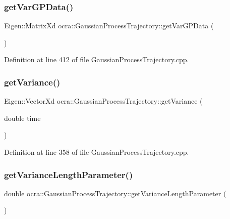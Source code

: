 \subsubsection{\texorpdfstring{get\+Var\+G\+P\+Data()}{getVarGPData()}}
{\footnotesize\ttfamily Eigen\+::\+Matrix\+Xd ocra\+::\+Gaussian\+Process\+Trajectory\+::get\+Var\+G\+P\+Data (\begin{DoxyParamCaption}{ }\end{DoxyParamCaption})}



Definition at line 412 of file Gaussian\+Process\+Trajectory.\+cpp.

\hypertarget{classocra_1_1GaussianProcessTrajectory_ac90c0664984dabfb530aa0437ec0a740}{}\label{classocra_1_1GaussianProcessTrajectory_ac90c0664984dabfb530aa0437ec0a740} 
\subsubsection{\texorpdfstring{get\+Variance()}{getVariance()}}
{\footnotesize\ttfamily Eigen\+::\+Vector\+Xd ocra\+::\+Gaussian\+Process\+Trajectory\+::get\+Variance (\begin{DoxyParamCaption}\item[{double}]{time }\end{DoxyParamCaption})}



Definition at line 358 of file Gaussian\+Process\+Trajectory.\+cpp.

\hypertarget{classocra_1_1GaussianProcessTrajectory_a7292af0c33589a01c7152f2316362c15}{}\label{classocra_1_1GaussianProcessTrajectory_a7292af0c33589a01c7152f2316362c15} 
\subsubsection{\texorpdfstring{get\+Variance\+Length\+Parameter()}{getVarianceLengthParameter()}}
{\footnotesize\ttfamily double ocra\+::\+Gaussian\+Process\+Trajectory\+::get\+Variance\+Length\+Parameter (\begin{DoxyParamCaption}{ }\end{DoxyParamCaption})\hspace{0.3cm}{\ttfamily [inline]}}



